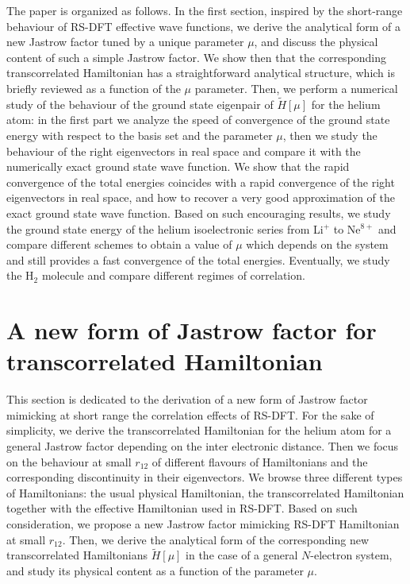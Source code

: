 \documentclass[aip,jcp,reprint,noshowkeys,superscriptaddress]{revtex4-1}
\begin{document}
The paper is organized as follows. 
In the first section, inspired by the short-range behaviour of RS-DFT effective wave functions,  
we derive the analytical form of a new Jastrow factor tuned by a unique parameter $\mu$, and discuss the physical content of such a simple Jastrow factor. 
We show then that the corresponding transcorrelated Hamiltonian has a straightforward analytical structure, which is briefly reviewed as a function of the $\mu$ parameter. 
Then, we perform a numerical study of the behaviour of the ground state eigenpair of $\tilde{H}[\mu]$ for the helium atom: 
in the first part we analyze the speed of convergence of the ground state energy with respect to the basis set and the parameter $\mu$, 
then we study the behaviour of the right eigenvectors in real space and compare it with the numerically exact ground state wave function. 
We show that the rapid convergence of the total energies coincides with a rapid convergence of the right eigenvectors in real space, and how to recover a very good approximation of the exact ground state wave function. 
Based on such encouraging results, we study the ground state energy of the helium isoelectronic series from Li$^+$ to Ne$^{8+}$ and compare different schemes to obtain 
a value of $\mu$ which depends on the system and still provides a fast convergence of the total energies. 
Eventually, we study the H$_2$ molecule and compare different regimes of correlation. 

\section{A new form of Jastrow factor for transcorrelated Hamiltonian}
This section is dedicated to the derivation of a new form of Jastrow factor mimicking at short range the correlation effects of RS-DFT. 
For the sake of simplicity, we derive the transcorrelated Hamiltonian for the helium atom for a general Jastrow factor depending on the inter electronic distance.  
Then we focus on the behaviour at small $r_{12}$ of different flavours of Hamiltonians 
and the corresponding discontinuity in their eigenvectors. 
We browse three different types of Hamiltonians: the usual physical Hamiltonian, the transcorrelated Hamiltonian together with the effective Hamiltonian used in RS-DFT.
Based on such consideration, we propose a new Jastrow factor mimicking RS-DFT Hamiltonian at small $r_{12}$. 
Then, we derive the analytical form of the corresponding new transcorrelated Hamiltonians $\tilde{H}[\mu]$ in the case of a general $N$-electron system, and study its physical content as a  function of the parameter $\mu$. 
\end{document}
